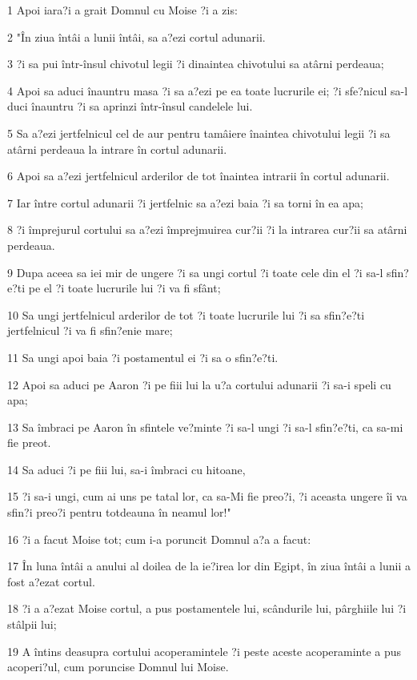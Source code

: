 \par 1 Apoi iara?i a grait Domnul cu Moise ?i a zis:
\par 2 "În ziua întâi a lunii întâi, sa a?ezi cortul adunarii.
\par 3 ?i sa pui într-însul chivotul legii ?i dinaintea chivotului sa atârni perdeaua;
\par 4 Apoi sa aduci înauntru masa ?i sa a?ezi pe ea toate lucrurile ei; ?i sfe?nicul sa-l duci înauntru ?i sa aprinzi într-însul candelele lui.
\par 5 Sa a?ezi jertfelnicul cel de aur pentru tamâiere înaintea chivotului legii ?i sa atârni perdeaua la intrare în cortul adunarii.
\par 6 Apoi sa a?ezi jertfelnicul arderilor de tot înaintea intrarii în cortul adunarii.
\par 7 Iar între cortul adunarii ?i jertfelnic sa a?ezi baia ?i sa torni în ea apa;
\par 8 ?i împrejurul cortului sa a?ezi împrejmuirea cur?ii ?i la intrarea cur?ii sa atârni perdeaua.
\par 9 Dupa aceea sa iei mir de ungere ?i sa ungi cortul ?i toate cele din el ?i sa-l sfin?e?ti pe el ?i toate lucrurile lui ?i va fi sfânt;
\par 10 Sa ungi jertfelnicul arderilor de tot ?i toate lucrurile lui ?i sa sfin?e?ti jertfelnicul ?i va fi sfin?enie mare;
\par 11 Sa ungi apoi baia ?i postamentul ei ?i sa o sfin?e?ti.
\par 12 Apoi sa aduci pe Aaron ?i pe fiii lui la u?a cortului adunarii ?i sa-i speli cu apa;
\par 13 Sa îmbraci pe Aaron în sfintele ve?minte ?i sa-l ungi ?i sa-l sfin?e?ti, ca sa-mi fie preot.
\par 14 Sa aduci ?i pe fiii lui, sa-i îmbraci cu hitoane,
\par 15 ?i sa-i ungi, cum ai uns pe tatal lor, ca sa-Mi fie preo?i, ?i aceasta ungere îi va sfin?i preo?i pentru totdeauna în neamul lor!"
\par 16 ?i a facut Moise tot; cum i-a poruncit Domnul a?a a facut:
\par 17 În luna întâi a anului al doilea de la ie?irea lor din Egipt, în ziua întâi a lunii a fost a?ezat cortul.
\par 18 ?i a a?ezat Moise cortul, a pus postamentele lui, scândurile lui, pârghiile lui ?i stâlpii lui;
\par 19 A întins deasupra cortului acoperamintele ?i peste aceste acoperaminte a pus acoperi?ul, cum poruncise Domnul lui Moise.
